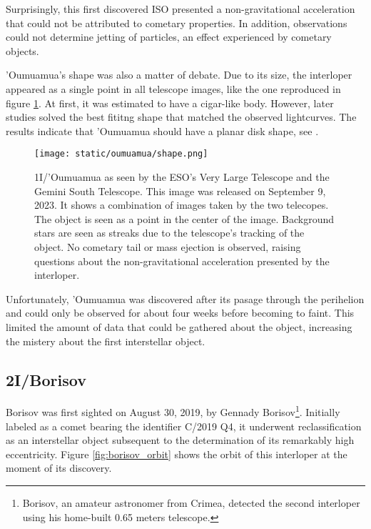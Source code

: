 Surprisingly, this first discovered ISO presented a non-gravitational
acceleration that could not be attributed to cometary properties. In addition,
observations could not determine jetting of particles, an effect experienced by
cometary objects.

'Oumuamua's shape was also a matter of debate. Due to its size, the interloper
appeared as a single point in all telescope images, like the one reproduced in
figure \ref{fig:oumuamua_shape}. At first, it was estimated to have a cigar-like
body. However, later studies solved the best fititng shape that matched the
observed lightcurves. The results indicate that 'Oumuamua should have a planar
disk shape, see \cite{seligman2022}.

\begin{figure}[H]
  \centering
  \texttt{[image: static/oumuamua/shape.png]}
  \caption['Oumuamua as seen by the ESO's VLT and GST telescopes]{
    1I/'Oumuamua as seen by the ESO's Very Large Telescope and the Gemini South
    Telescope. This image was released on September 9, 2023. It shows a
    combination of images taken by the two telecopes. The object is seen as
    a point in the center of the image. Background stars are seen as streaks
    due to the telescope's tracking of the object. No cometary tail or mass
    ejection is observed, raising questions about the non-gravitational
    acceleration presented by the interloper.
  }
  \label{fig:oumuamua_shape}
\end{figure}

Unfortunately, 'Oumuamua was discovered after its pasage through the perihelion
and could only be observed for about four weeks before becoming to faint. This
limited the amount of data that could be gathered about the object, increasing
the mistery about the first interstellar object.

\subsection{2I/Borisov}

Borisov was first sighted on August 30, 2019, by Gennady
Borisov\footnote{Borisov, an amateur astronomer from Crimea, detected the second
  interloper using his home-built 0.65 meters telescope.}. Initially labeled as a
comet bearing the identifier C/2019 Q4, it underwent reclassification as an
interstellar object subsequent to the determination of its remarkably high
eccentricity. Figure \ref{fig:borisov_orbit} shows the orbit of this interloper
at the moment of its discovery.

